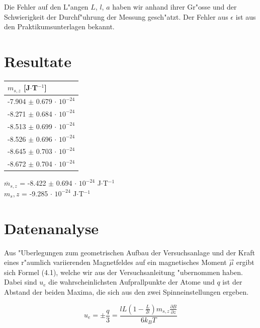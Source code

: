 \documentclass[a4paper,parskip,11pt, DIV12]{scrreprt}
\begin{document}
Die Fehler auf den L"angen $L$, $l$, $a$ haben wir anhand ihrer Gr"osse und der Schwierigkeit der Durchf"uhrung der Messung gesch"atzt. Der Fehler aus $\epsilon$ ist aus den Praktikumsunterlagen bekannt.
\clearpage

\chapter{Resultate}

\begin{table}[H]
\centering
\renewcommand{\arraystretch}{1.2} %
\setlength{\tabcolsep}{3mm} %
\begin{tabular}{l}
$m_{s,z}$ [J$\cdot$T$^{-1}$] \\ \hline
-7.904 $\pm$ 0.679 $\cdot$ $10^{-24}$\\
-8.271 $\pm$ 0.684 $\cdot$ $10^{-24}$\\
-8.513 $\pm$ 0.699 $\cdot$ $10^{-24}$\\
-8.526 $\pm$ 0.696 $\cdot$ $10^{-24}$\\
-8.645 $\pm$ 0.703 $\cdot$ $10^{-24}$\\
-8.672 $\pm$ 0.704 $\cdot$ $10^{-24}$\\
\end{tabular}
\end{table} 

$\overline{m}_{s,z}$ = -8.422 $\pm$ 0.694 $\cdot$ $10^{-24}$ J$\cdot$T$^{-1}$\\
$m_s,z$ = -9.285 $\cdot$ $10^{-24}$ J$\cdot$T$^{-1}$   \footnotesize{ \cite{https://en.wikipedia.org} }


\clearpage


\chapter{Datenanalyse}

Aus "Uberlegungen zum geometrischen Aufbau der Versuchsanlage und der Kraft eines r"aumlich variierenden Magnetfeldes auf ein magnetisches Moment $\vec{ \mu }$ ergibt sich Formel (4.1), welche wir aus der Versuchsanleitung "ubernommen haben. Dabei sind $u_e$ die wahrscheinlichsten Aufprallpunkte der Atome und $q$ ist der Abstand der beiden Maxima, die sich aus den zwei Spinneinstellungen ergeben.


\begin{equation}
u_e=\pm \frac{q}{3}=\frac{lL(1-\frac{L}{2l})m_{s,z} \frac{\partial B}{\partial z}}{6k_BT}
\end{equation}
\end{document}

